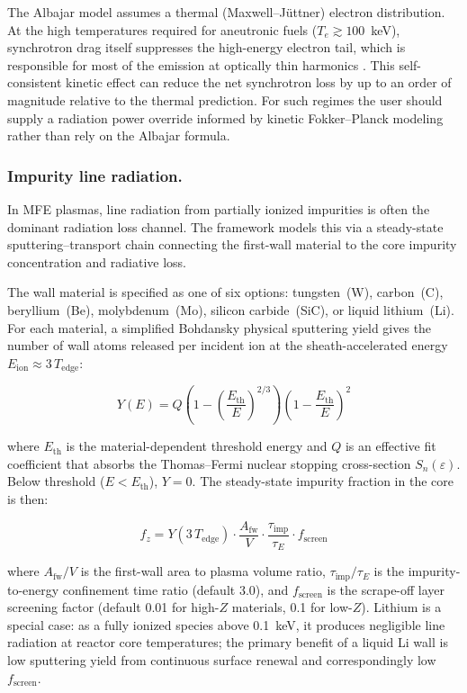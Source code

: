 \documentclass{article}
\begin{document}
The Albajar model assumes a thermal (Maxwell--J\"uttner) electron
distribution. At the high temperatures required for aneutronic fuels
($T_e \gtrsim 100$~keV), synchrotron drag itself suppresses the
high-energy electron tail, which is responsible for most of the
emission at optically thin harmonics \citep{ochs2024}. This
self-consistent kinetic effect can reduce the net synchrotron loss by
up to an order of magnitude relative to the thermal prediction. For
such regimes the user should supply a radiation power override
informed by kinetic Fokker--Planck modeling rather than rely on the
Albajar formula.

\subsubsection{Impurity line radiation.}
In MFE plasmas, line radiation from partially ionized impurities is
often the dominant radiation loss channel. The framework models this
via a steady-state sputtering--transport chain connecting the
first-wall material to the core impurity concentration and radiative
loss.

The wall material is specified as one of six options: tungsten~(W),
carbon~(C), beryllium~(Be), molybdenum~(Mo), silicon carbide~(SiC),
or liquid lithium~(Li). For each material, a simplified Bohdansky
physical sputtering yield \citep{bohdansky1984, eckstein2007} gives
the number of wall atoms released per incident ion at the
sheath-accelerated energy $E_{\text{ion}} \approx 3\,T_{\text{edge}}$:

\begin{equation}
\label{eq:sputtering}
Y(E) = Q \left(1 - \left(\frac{E_{\text{th}}}{E}\right)^{2/3}\right)
       \left(1 - \frac{E_{\text{th}}}{E}\right)^{2}
\end{equation}

\noindent where $E_{\text{th}}$ is the material-dependent threshold
energy and $Q$ is an effective fit coefficient that absorbs the
Thomas--Fermi nuclear stopping cross-section $S_n(\varepsilon)$. Below
threshold ($E < E_{\text{th}}$), $Y = 0$. The steady-state impurity fraction in the core is then:

\begin{equation}
\label{eq:f-impurity}
f_z = Y(3\,T_{\text{edge}}) \cdot
  \frac{A_{\text{fw}}}{V} \cdot
  \frac{\tau_{\text{imp}}}{\tau_E} \cdot f_{\text{screen}}
\end{equation}

\noindent where $A_{\text{fw}}/V$ is the first-wall area to plasma
volume ratio, $\tau_{\text{imp}}/\tau_E$ is the impurity-to-energy
confinement time ratio (default 3.0), and $f_{\text{screen}}$ is the
scrape-off layer screening factor (default 0.01 for high-$Z$
materials, 0.1 for low-$Z$). Lithium is a special case: as a fully
ionized species above 0.1~keV, it produces negligible line
radiation at reactor core temperatures; the primary benefit of a
liquid Li wall is low sputtering yield from continuous surface renewal
and correspondingly low $f_{\text{screen}}$.
\end{document}
